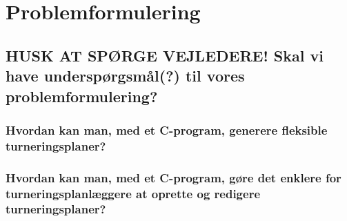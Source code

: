 \chapter{Problemformulering}\label{ch:chlabel}
\section*{HUSK AT SPØRGE VEJLEDERE! Skal vi have underspørgsmål(?) til vores problemformulering?}
\subsection*{Hvordan kan man, med et C-program, generere fleksible turneringsplaner?}
\subsection*{Hvordan kan man, med et C-program, gøre det enklere for turneringsplanlæggere at oprette og redigere turneringsplaner?}

